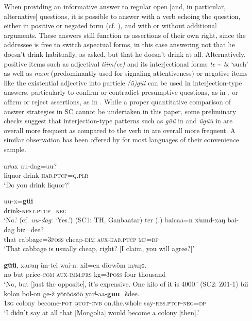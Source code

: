 \documentclass[output=paper,colorlinks,citecolor=brown,chinesefont]{langscibook}
\begin{document}
When providing an informative answer to regular open [and, in particular, alternative] questions, it is possible to answer with a verb echoing the question, either in positive or negated form (cf. \citealt[21--22]{Guntsetseg2016}), and with or without additional arguments. These answers still function as assertions of their own right, since the addressee is free to switch aspectual forms, in this case answering not that he doesn’t drink habitually, as asked, but that he doesn’t drink at all. Alternatively, positive items such as adjectival \textit{tiim(ee)} and its interjectional forms \textit{te} {\textasciitilde} \textit{tx} ‘such’ as well as \textit{mxm} (predominantly used for signaling attentiveness) or negative items like the existential adjective into particle \textit{(ü)güi} can be used in interjection-type answers, particularly to confirm \citep[94--95]{Binnick2012} or contradict presumptive questions, as in , or affirm or reject assertions, as in . While a proper quantitative comparison of answer strategies in SC cannot be undertaken in this paper, some preliminary checks suggest that interjection-type patterns such as \textit{güü} in  and \textit{ügüü} in  are overall more frequent as compared to the verb in  are overall more frequent. A similar observation has been offered by \citealt{EnfieldEtAl2019} for most languages of their convenience sample.


\ea\label{ex:kha:48}
    \ea\label{ex:kha:48a}
        \gll arʲax uu-dag=uu? \\ 
             liquor drink-\textsc{hab.ptcp=q.plr} \\
        \glt ‘Do you drink liquor?’
    
    \ex\label{ex:kha:48b}
        \gll uu-x=\textbf{güi} \\
             drink-\textsc{npst.ptcp=neg} \\
        \glt ‘No.’ (cf. \textit{uu-dag}: ‘Yes.’) (SC1: TH, Ganbaatar)
    \z
\z 
\ea\label{ex:kha:49}
    \ea\label{ex:kha:49a}
        \gll ter (.) baicaa=n xʲamd-xaŋ bai-dag biz=dee? \\ 
             that {} cabbage=\textsc{3poss} cheap-\textsc{dim} \textsc{aux-hab.ptcp} \textsc{mp=dp} \\
        \glt ‘That cabbage is usually cheap, right? [I claim, you will agree?]’
    
    \ex\label{ex:kha:49b}
        \gll \textbf{güü}, xarʲaŋ ün-tei wai-n. xil=en dörwöm mʲaŋɢ. \\
             no but price-\textsc{com} \textsc{aux-imm.prs} kg=\textsc{3poss} four thousand \\
        \glt ‘No, but [just the opposite], it’s expensive. One kilo of it is 4000.’ (SC2: Z01-1)
    \z
\z 
\ea\label{ex:kha:50}
    \ea\label{ex:kha:50a}
        \gll bii   kolon bol-on ge-ž yöröösöö yarʲ-aa-\textbf{guu}=šdee. \\ 
             \textsc{1sg} colony become-\textsc{pot} \textsc{quot-cvb} on.the.whole say-\textsc{res.ptcp-neg=dp} \\
        \glt ‘I didn’t say at all that [Mongolia] would become a colony [then].’
    
\end{document}
